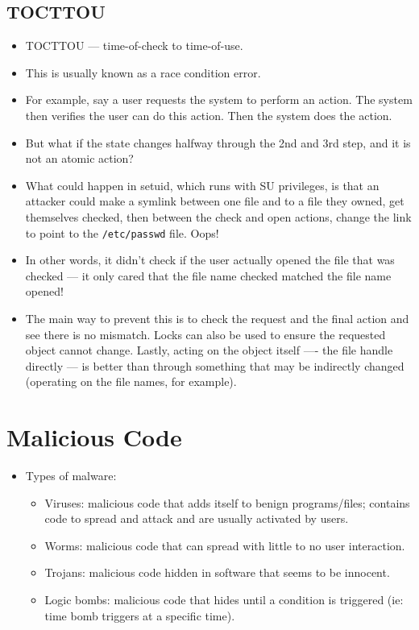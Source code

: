 \documentclass{article}
\begin{document}
\subsection{TOCTTOU}
\begin{itemize}
    \item TOCTTOU --- time-of-check to time-of-use.
    \item This is usually known as a race condition error.
    \item For example, say a user requests the system to perform an action.  The system then verifies the user can do this action.  Then the system does the action.
    \item But what if the state changes halfway through the 2nd and 3rd step, and it is not an atomic action?
    \item What could happen in setuid, which runs with SU privileges, is that an attacker could make a symlink between one file and to a file they owned, get themselves checked, then between the check and open actions, change the link to point to the \lstinline{/etc/passwd} file.  Oops!
    \item In other words, it didn't check if the user actually opened the file that was checked --- it only cared that the file name checked matched the file name opened!
    \item The main way to prevent this is to check the request and the final action and see there is no mismatch.  Locks can also be used to ensure the requested object cannot change.  Lastly, acting on the object itself ---- the file handle directly --- is better than through something that may be indirectly changed (operating on the file names, for example).
\end{itemize}

\section{Malicious Code}
\begin{itemize}
    \item Types of malware:
        \begin{itemize}
            \item Viruses: malicious code that adds itself to benign programs/files; contains code to spread and attack and are usually activated by users.
            \item Worms: malicious code that can spread with little to no user interaction.
            \item Trojans: malicious code hidden in software that seems to be innocent.
            \item Logic bombs: malicious code that hides until a condition is triggered (ie: time bomb triggers at a specific time).
        \end{itemize}
\end{itemize}
\end{document}
